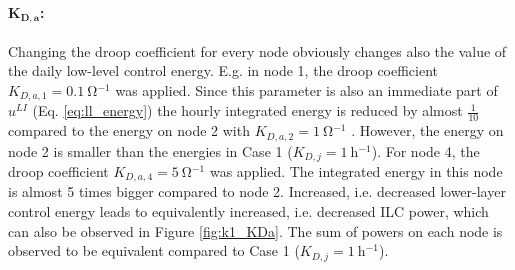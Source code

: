 \paragraph{$\boldsymbol{K_{D,a}}$:} 
Changing the droop coefficient for every node obviously changes also the value of the daily low-level control energy. E.g. in node 1, the droop coefficient $K_{D,a,1} = \SI{0.1}{\ohm^{-1}}$ was applied. Since this parameter is also an immediate part of $u^{LI}$ (Eq. \ref{eq:ll_energy}) the hourly integrated energy is reduced by almost $\frac{1}{10}$ compared to the energy on node 2 with $K_{D,a,2} = \SI{1}{\ohm^{-1}}$ . However, the energy on node 2 is smaller than the energies in Case 1 ($K_{D,j} = \SI{1}{\hour^{-1}}$). For node 4, the droop coefficient $K_{D,a,4} = \SI{5}{\ohm^{-1}}$ was applied. The integrated energy in this node is almost 5 times bigger compared to node 2. Increased, i.e. decreased lower-layer control energy leads to equivalently increased, i.e. decreased ILC power, which can also be observed in Figure \ref{fig:k1_KDa}. The sum of powers on each node is observed to be equivalent compared to Case 1 ($K_{D,j} = \SI{1}{\hour^{-1}}$). 
